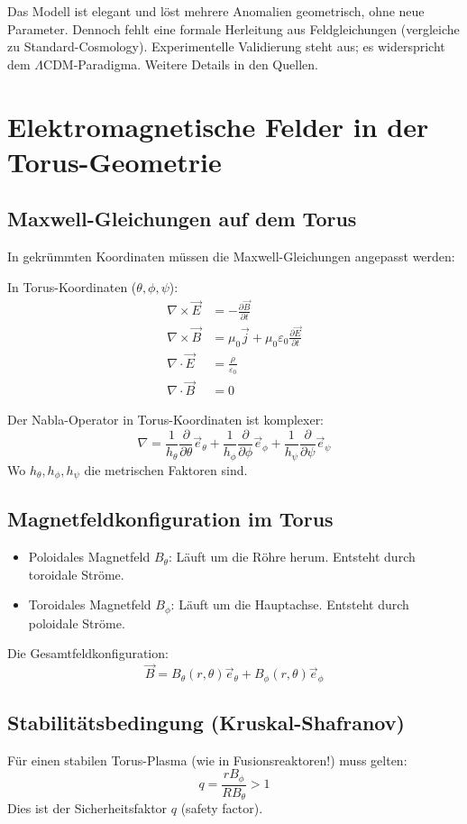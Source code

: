 \documentclass[12pt,a4paper]{article}
\begin{document}
	Das Modell ist elegant und löst mehrere Anomalien geometrisch, ohne neue Parameter. Dennoch fehlt eine formale Herleitung aus Feldgleichungen (vergleiche zu Standard-Cosmology). Experimentelle Validierung steht aus; es widerspricht dem $\Lambda$CDM-Paradigma. Weitere Details in den Quellen.
	\section{Elektromagnetische Felder in der Torus-Geometrie}
	\subsection{Maxwell-Gleichungen auf dem Torus}
	In gekrümmten Koordinaten müssen die Maxwell-Gleichungen angepasst werden:
	
	In Torus-Koordinaten (\( \theta, \phi, \psi \)):
	\begin{align}
		\nabla \times \vec{E} &= -\frac{\partial \vec{B}}{\partial t} \\
		\nabla \times \vec{B} &= \mu_0 \vec{j} + \mu_0 \varepsilon_0 \frac{\partial \vec{E}}{\partial t} \\
		\nabla \cdot \vec{E} &= \frac{\rho}{\varepsilon_0} \\
		\nabla \cdot \vec{B} &= 0
	\end{align}
	
	Der Nabla-Operator in Torus-Koordinaten ist komplexer:
	\[
	\nabla = \frac{1}{h_\theta} \frac{\partial}{\partial \theta} \vec{e}_\theta + \frac{1}{h_\phi} \frac{\partial}{\partial \phi} \vec{e}_\phi + \frac{1}{h_\psi} \frac{\partial}{\partial \psi} \vec{e}_\psi
	\]
	Wo \( h_\theta, h_\phi, h_\psi \) die metrischen Faktoren sind.
	
	\subsection{Magnetfeldkonfiguration im Torus}
	\begin{itemize}
		\item Poloidales Magnetfeld \( B_\theta \):
		Läuft um die Röhre herum. Entsteht durch toroidale Ströme.
		\item Toroidales Magnetfeld \( B_\phi \):
		Läuft um die Hauptachse. Entsteht durch poloidale Ströme.
	\end{itemize}
	
	Die Gesamtfeldkonfiguration:
	\[
	\vec{B} = B_\theta(r, \theta) \vec{e}_\theta + B_\phi(r, \theta) \vec{e}_\phi
	\]
	
	\subsection{Stabilitätsbedingung (Kruskal-Shafranov)}
	Für einen stabilen Torus-Plasma (wie in Fusionsreaktoren!) muss gelten:
	\[
	q = \frac{r B_\phi}{R B_\theta} > 1
	\]
	Dies ist der Sicherheitsfaktor \( q \) (safety factor).
	
\end{document}
